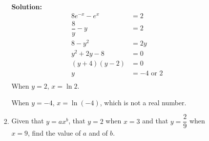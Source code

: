 \documentclass{report}
\newcommand{\sol}{\vspace{0.2cm}\textbf{Solution:}\vspace{0.2cm}}
\begin{document}
\begin{multicols*}{2}
\begin{enumerate}[leftmargin=*]
\begin{enumerate}
\begin{enumerate}
                                  \sol{}
                                  \begin{align*}
                                      8 e^{-x} - e^x   & = 2                \\
                                      \dfrac{8}{y} - y & = 2                \\
                                      8 - y^2          & = 2y               \\
                                      y^2 + 2y - 8     & = 0                \\
                                      (y + 4)(y - 2)   & = 0                \\
                                      y                & = -4 \text{ or } 2 \\
                                  \end{align*}
                                  When $y = 2$, $x = \ln 2$.

                                  When $y = -4$, $x = \ln (-4)$, which is not a real number.
                            \item Given that $y=a x^b$, that $y=2$ when $x=3$ and that $y=\dfrac{2}{9}$ when
                                  $x=9$, find the value of $a$ and of $b$.


\end{enumerate}
\end{enumerate}
\end{enumerate}
\end{multicols*}
\end{document}
